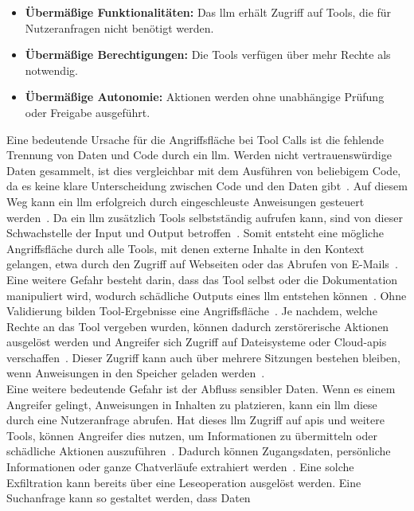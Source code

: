 \begin{itemize}
    \item \textbf{Übermäßige Funktionalitäten:} Das \ac{llm} erhält Zugriff auf Tools, die für Nutzeranfragen nicht benötigt werden.
    \item \textbf{Übermäßige Berechtigungen:} Die Tools verfügen über mehr Rechte als notwendig. 
    \item \textbf{Übermäßige Autonomie:} Aktionen werden ohne unabhängige Prüfung oder Freigabe ausgeführt.
\end{itemize}  

Eine bedeutende Ursache für die Angriffsfläche bei Tool Calls ist die fehlende Trennung von Daten und Code durch ein \ac{llm}. Werden nicht vertrauenswürdige
Daten gesammelt, ist dies vergleichbar mit dem Ausführen von beliebigem Code, da es keine klare Unterscheidung zwischen Code und den Daten gibt~\cite[3]{cb09}.
Auf diesem Weg kann ein \ac{llm} erfolgreich durch eingeschleuste Anweisungen gesteuert werden~\cite[6]{cb09}. Da ein \ac{llm} zusätzlich Tools selbstständig
aufrufen kann, sind von dieser Schwachstelle der Input und Output betroffen~\cite[5]{cb09}. Somit entsteht eine mögliche Angriffsfläche durch alle Tools, 
mit denen externe Inhalte in den Kontext gelangen, etwa durch den Zugriff auf Webseiten oder das Abrufen von E-Mails~\cite[5\psq]{cb09}. Eine weitere Gefahr
besteht darin, dass das Tool selbst oder die Dokumentation manipuliert wird, wodurch schädliche Outputs eines \ac{llm} entstehen können~\cite[26]{tc11}.
Ohne Validierung bilden Tool-Ergebnisse eine Angriffsfläche~\cite[10]{cb09}. Je nachdem, welche Rechte an das Tool vergeben wurden, können dadurch 
zerstörerische Aktionen ausgelöst werden und Angreifer sich Zugriff auf Dateisysteme oder Cloud-\acp{api} verschaffen~\cite[11]{pi24}. Dieser Zugriff kann auch 
über mehrere Sitzungen bestehen bleiben, wenn Anweisungen in den Speicher geladen werden~\cite[4]{cb09}. \\
Eine weitere bedeutende Gefahr ist der Abfluss sensibler Daten. Wenn es einem Angreifer gelingt, Anweisungen in Inhalten zu platzieren, kann ein
\ac{llm} diese durch eine Nutzeranfrage abrufen. Hat dieses \ac{llm} Zugriff auf \acp{api} und weitere Tools, können Angreifer dies nutzen, um 
Informationen zu übermitteln oder schädliche Aktionen auszuführen~\cite[3]{cb09}. Dadurch können Zugangsdaten, persönliche Informationen oder ganze Chatverläufe 
extrahiert werden~\cite[4]{cb09}. Eine solche Exfiltration kann bereits über eine Leseoperation ausgelöst werden. Eine Suchanfrage kann so gestaltet werden, dass Daten
